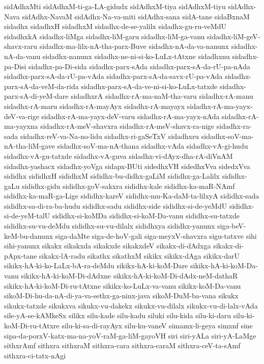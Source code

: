{sidAdhxMti
sidAdhxM-ti-ga-LA-gidudx
sidAdhxM-tiya
sidAdhxM-tiyu
sidAdhx-Nava
sidAdhx-NavaM
sidAdhx-Na-va-miti
sidAdhx-sana
sidA-tane
sidaBxnaM
sidadhx
sidadhxH
sidadhxM
sidadhx-de-se-yalilx
sidadhx-gu-ru-veMdU
sidadhxkA
sidadhx-liMga
sidadhx-liM-garu
sidadhx-liM-ga-vanu
sidadhx-liM-geV-shavx-raru
sidadhx-ma-lilx-nA-tha-parx-Buve
sidadhx-nA-da-va-nanunx
sidadhx-nA-da-vanu
sidadhx-nanunx
sidadhx-ne-ni-si-ko-LuLx-tAtxne
sidadhxnu
sidadhx-pa-Disi
sidadhx-pa-Di-sida
sidadhx-parx-sAda
sidadhx-parx-sA-da-rU-pa-nAda
sidadhx-parx-sA-da-rU-pa-vAda
sidadhx-parx-sA-da-savx-rU-pa-vAda
sidadhx-parx-sA-da-veM-da-rida
sidadhx-parx-sA-da-ve-ni-si-ko-LuLx-tatxde
sidadhx-parx-sA-di-yeM-dare
sidadhxrA
sidadhx-rA-ma-naM-tha-varu
sidadhx-rA-manu
sidadhx-rA-maru
sidadhx-rA-mayAyx
sidadhx-rA-mayayx
sidadhx-rA-ma-yayx-deV-va-rige
sidadhx-rA-ma-yayx-deV-varu
sidadhx-rA-ma-yayx-nAda
sidadhx-rA-ma-yayxna
sidadhx-rA-meV-shavxra
sidadhx-rA-meV-shavx-ra-nige
sidadhx-ra-sada
sidadhx-reV-va-Na-no-lidu
sidadhx-ri-gaSeTxV
sidadhxru
sidadhx-soV-ma-nA-tha-liM-gave
sidadhx-soV-ma-nA-thana
sidadhx-vAda
sidadhx-vA-gi-hudu
sidadhx-vA-gu-tatxde
sidadhx-vA-guva
sidadhx-vi-dAyx-dha-rA-diVnAM
sidadhx-yashacx
sidadhx-yoVga
sidapx-BUti
sidedhxVH
sidedhxVva
sidedxVva
sididhx
sididhxH
sididhxM
sididhx-bu-didhx-gaLiM
sididhx-ga-Lalilx
sididhx-gaLu
sididhx-gidu
sididhx-goV-sakxra
sididhx-kale
sididhx-ka-maR-NAmf
sididhx-ka-maR-ga-Lige
sididhx-kareV
sididhx-mu-Ka-daM-ta-lilxyA
sididhx-sada
sididhx-sa-di-ra-ba-hudu
sididhx-sadu
sididhx-side
sididhx-si-de-yeMdU
sididhx-si-de-yeM-talU
sididhx-si-koMDa
sididhx-si-koM-Da-vanu
sididhx-su-tatxde
sididhx-su-vu-deMdu
sididhx-su-vu-dilalx
sididhxya
sididhx-yanunx
siga-beV-keM-bu-danunx
siga-daMte
siga-de-hoV-gali
siga-meyxV-shavxra
sigu-tatxve
sihi
sihi-yanunx
sikakx
sikakxda
sikakxde
sikakxdeV
sikakx-di-dAdxga
sikakx-di-pApx-tane
sikakx-lA-radu
sikathx
sikathxM
sikikx
sikikx-dAga
sikikx-darU
sikikx-hA-ki-ko-LaLx-bA-ra-deMdu
sikikx-hA-ki-koM-Dare
sikikx-hA-ki-koM-Da-vanu
sikikx-hA-ki-koM-Di-dAdxne
sikikx-hA-ki-koM-Di-dAdx-neM-dathaR
sikikx-hA-ki-koM-Di-ru-tAtxne
sikikx-ko-LuLx-va-vanu
sikikx-koM-Da-vanu
sikoM-Di-hu-da-nA-di-ya-va-sethx-ga-ninx-java
sikoM-DuM-ba-vana
sikukx
sikukx-tatxde
sikukxva
sikukx-vu-dakekx
sikukx-vu-dilalx
sikukx-vu-di-lalx-vAda
sile-yA-se-kAMkeSx
silikx
silu-kade
silu-kadu
siluki
silu-kida
silu-ki-daru
silu-ki-koM-Di-ru-tAtxre
silu-ki-sa-di-rayAyx
silu-ku-vaneV
simamx-li-geya
simxnf
sine
sipa-da-porxV-katx-ma-na-yoV-raM-ga-liM-gayoVH
siri
siri-yALa
siri-yA-LaMge
sithxrAmf
sithxra
sithxraM
sithxra-cara
sithxra-caraM
sithxra-ceV-ta-sAmf
sithxra-ci-tatx-nAgi
}
